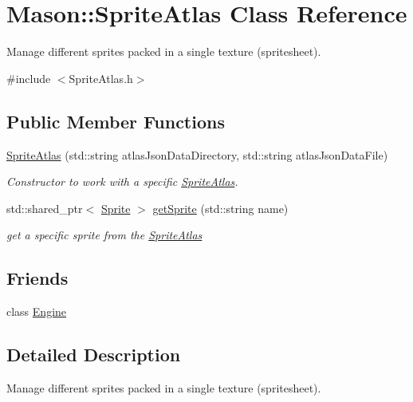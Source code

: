 \hypertarget{class_mason_1_1_sprite_atlas}{}\section{Mason\+:\+:Sprite\+Atlas Class Reference}
\label{class_mason_1_1_sprite_atlas}


Manage different sprites packed in a single texture (spritesheet).  




{\ttfamily \#include $<$Sprite\+Atlas.\+h$>$}

\subsection*{Public Member Functions}
\begin{DoxyCompactItemize}
\item 
\hyperlink{class_mason_1_1_sprite_atlas_a7740eb98380f42a0d5b787d44114be8f}{Sprite\+Atlas} (std\+::string atlas\+Json\+Data\+Directory, std\+::string atlas\+Json\+Data\+File)
\begin{DoxyCompactList}\small\item\em Constructor to work with a specific \hyperlink{class_mason_1_1_sprite_atlas}{Sprite\+Atlas}. \end{DoxyCompactList}\item 
std\+::shared\+\_\+ptr$<$ \hyperlink{class_mason_1_1_sprite}{Sprite} $>$ \hyperlink{class_mason_1_1_sprite_atlas_a05b230664b024ef23726bfa509da6a40}{get\+Sprite} (std\+::string name)
\begin{DoxyCompactList}\small\item\em get a specific sprite from the \hyperlink{class_mason_1_1_sprite_atlas}{Sprite\+Atlas} \end{DoxyCompactList}\end{DoxyCompactItemize}
\subsection*{Friends}
\begin{DoxyCompactItemize}
\item 
class \hyperlink{class_mason_1_1_sprite_atlas_a3e1914489e4bed4f9f23cdeab34a43dc}{Engine}
\end{DoxyCompactItemize}


\subsection{Detailed Description}
Manage different sprites packed in a single texture (spritesheet). 

